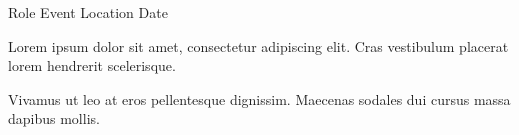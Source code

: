 \begin{cventries}
  \cventry
    {Role}
    {Event}
    {Location}
    {Date}
    {
      \begin{cvitems}
        \item{Lorem ipsum dolor sit amet, consectetur adipiscing elit. Cras vestibulum placerat lorem hendrerit scelerisque.}
        \item{Vivamus ut leo at eros pellentesque dignissim. Maecenas sodales dui cursus massa dapibus mollis.}
      \end{cvitems}
    }
\end{cventries}
